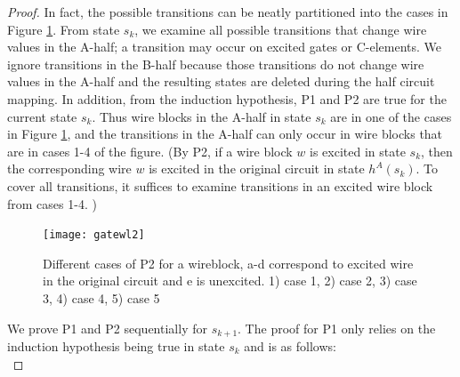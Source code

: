 \documentclass[12pt]{report}
\begin{document}
\begin{proof}
In fact, the possible transitions can be neatly partitioned into the cases in Figure \ref{fig:l1helper}.  From state $s_k$, we examine all possible transitions that change wire values in the A-half; a transition may occur on excited gates or C-elements.  We ignore transitions in the B-half because those transitions do not change wire values in the A-half and the resulting states are deleted during the half circuit mapping.  In addition, from the induction hypothesis, P1 and P2 are true for the current state $s_k$.   Thus wire blocks in the A-half in state $s_k$ are in one of the cases in Figure \ref{fig:l1helper}, and the transitions in the A-half can only occur in wire blocks that are in cases 1-4 of the figure.  (By P2, if a wire block $w$ 
is excited in state $s_k$, then the corresponding wire $w$ is excited in the original circuit in state $h^A(s_k)$.  To cover all transitions, it suffices to examine transitions in an excited wire block from cases 1-4. ) \\

 

\begin{figure}
  \centering
    \texttt{[image: gatewl2]}
  \caption{Different cases of P2 for a wireblock, a-d correspond to excited wire in the original circuit and e is unexcited.  1) case 1, 2) case 2, 3) case 3, 4) case 4, 5) case 5}
  \label{fig:l1helper}
\end{figure}

We prove P1 and P2 sequentially for $s_{k+1}$.  The proof for P1 only relies on the induction hypothesis being true in state $s_k$ and is as follows: \\


\end{proof}
\end{document}
